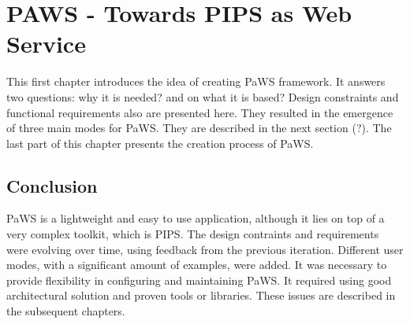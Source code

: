 \chapter{PAWS - Towards PIPS as Web Service}

This first chapter introduces the idea of creating PaWS framework. It
answers two questions: why it is needed? and on what it is based? Design
constraints and functional requirements also are presented here. They
resulted in the emergence of three main modes for PaWS. They are
described in the next section (?). The last part of this chapter presents
the creation process of PaWS.







\section{Conclusion}

PaWS is a lightweight and easy to use application, although it lies on
top of a very complex toolkit, which is PIPS. The design contraints
and requirements were evolving over time, using feedback from the
previous iteration. Different user modes, with a significant amount of
examples, were added.  It was necessary to provide flexibility in
configuring and maintaining PaWS. It required using good architectural
solution and proven tools or libraries. These issues are described in
the subsequent chapters.

